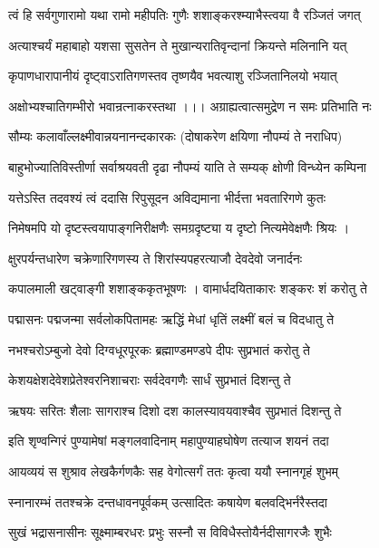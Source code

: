 \twolineshloka
{त्वं हि सर्वगुणारामो यथा रामो महीपतिः}
{गुणैः शशाङ्करश्म्याभैस्त्वया वै रञ्जितं जगत्}%

\twolineshloka
{अत्याश्चर्यं महाबाहो यशसा सुसतेन ते}
{मुखान्यरातिवृन्दानां क्रियन्ते मलिनानि यत्} %

\twolineshloka
{कृपाणधारापानीयं दृष्ट्वाऽरातिगणस्तव}
{तृष्णयैव भवत्याशु रञ्जितानिलयो भयात्}%

\twolineshloka
{अक्षोभ्यश्चातिगम्भीरो भवान्रत्नाकरस्तथा ।।।}
{अग्राह्यत्वात्समुद्रेण न समः प्रतिभाति नः}%

\twolineshloka
{सौम्यः कलावाँल्लक्ष्मीवान्नयनानन्दकारकः}
{(दोषाकरेण क्षयिणा नौपम्यं ते नराधिप)}%

\twolineshloka
{बाहुभोज्यातिविस्तीर्णा सर्वाश्रयवती दृढा}
{नौपम्यं याति ते सम्यक् क्षोणी विन्ध्येन कम्पिना}%

\twolineshloka
{यत्तेऽस्ति तदवश्यं त्वं ददासि रिपुसूदन}
{अविद्यमाना भीर्दत्ता भवतारिगणे कुतः}%

\twolineshloka
{निमेषमपि यो दृष्टस्त्वयापाङ्गनिरीक्षणैः}
{समग्रदृष्ट्या य दृष्टो नित्यमेवेक्षणैः श्रियः ।}%

\twolineshloka
{क्षुरपर्यन्तधारेण चक्रेणारिगणस्य ते}
{शिरांस्यपहरत्याजौ देवदेवो जनार्दनः}%

\twolineshloka
{कपालमाली खट्वाङ्गी शशाङ्ककृतभूषणः ।}
{वामार्धदयिताकारः शङ्करः शं करोतु ते}%

\twolineshloka
{पद्मासनः पद्मजन्मा सर्वलोकपितामहः}
{ऋद्धिं मेधां धृतिं लक्ष्मीं बलं च विदधातु ते}%

\twolineshloka
{नभश्चरोऽम्बुजो देवो दिग्वधूरपूरकः}
{ब्रह्माण्डमण्डपे दीपः सुप्रभातं करोतु ते} %

\twolineshloka
{केशयक्षेशदेवेशप्रेतेश्वरनिशाचराः}
{सर्वदेवगणैः सार्धं सुप्रभातं दिशन्तु ते}%

\twolineshloka
{ऋषयः सरितः शैलाः सागराश्च दिशो दश}
{कालस्यावयवाश्चैव सुप्रभातं दिशन्तु ते}%

\twolineshloka
{इति शृण्वन्गिरं पुण्यामेषां मङ्गलवादिनाम्}
{महापुण्याहघोषेण तत्याज शयनं तदा}%

\twolineshloka
{आयव्ययं स शुश्राव लेखकैर्गणकैः सह}
{वेगोत्सर्गं ततः कृत्वा ययौ स्नानगृहं शुभम्}%

\twolineshloka
{स्नानारम्भं ततश्चक्रे दन्तधावनपूर्वकम्}
{उत्सादितः कषायेण बलवद्भिर्नरैस्तदा}%

\twolineshloka
{सुखं भद्रासनासीनः सूक्ष्माम्बरधरः प्रभुः}
{सस्नौ स विविधैस्तोयैर्नदीसागरजैः शुभैः}%

